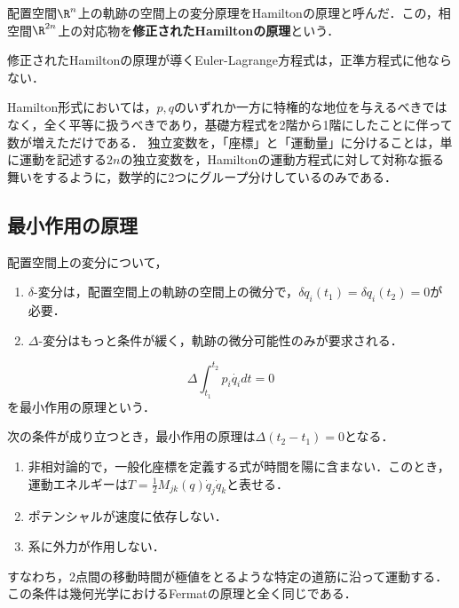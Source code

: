 \documentclass[uplatex,dvipdfmx]{jsreport}
\begin{document}
\begin{tcolorbox}[colframe=ForestGreen, colback=ForestGreen!10!white,breakable,colbacktitle=ForestGreen!40!white,coltitle=black,fonttitle=\bfseries\sffamily,
title=]
    配置空間$\R^n$上の軌跡の空間上の変分原理をHamiltonの原理と呼んだ．この，相空間$\R^{2n}$上の対応物を\textbf{修正されたHamiltonの原理}という．
\end{tcolorbox}

\begin{theorem}
    修正されたHamiltonの原理が導くEuler-Lagrange方程式は，正準方程式に他ならない．
\end{theorem}

\begin{remarks}
    Hamilton形式においては，$p,q$のいずれか一方に特権的な地位を与えるべきではなく，全く平等に扱うべきであり，基礎方程式を2階から1階にしたことに伴って数が増えただけである．
    独立変数を，「座標」と「運動量」に分けることは，単に運動を記述する$2n$の独立変数を，Hamiltonの運動方程式に対して対称な振る舞いをするように，数学的に2つにグループ分けしているのみである．
\end{remarks}

\subsection{最小作用の原理}

\begin{definition}
    配置空間上の変分について，
    \begin{enumerate}
        \item $\delta$-変分は，配置空間上の軌跡の空間上の微分で，$\delta q_i(t_1)=\delta q_i(t_2)=0$が必要．
        \item $\Delta$-変分はもっと条件が緩く，軌跡の微分可能性のみが要求される．
    \end{enumerate}
\end{definition}

\begin{axiom}
    \[\Delta\int^{t_2}_{t_1}p_i\dot{q_i}dt=0\]
    を最小作用の原理という．
\end{axiom}

\begin{proposition}[幾何光学のFermatの原理との類似性]
    次の条件が成り立つとき，最小作用の原理は$\Delta(t_2-t_1)=0$となる．
    \begin{enumerate}
        \item 非相対論的で，一般化座標を定義する式が時間を陽に含まない．このとき，運動エネルギーは$T=\frac{1}{2}M_{jk}(q)\dot{q}_j\dot{q}_k$と表せる．
        \item ポテンシャルが速度に依存しない．
        \item 系に外力が作用しない．
    \end{enumerate}
    すなわち，2点間の移動時間が極値をとるような特定の道筋に沿って運動する．
    この条件は幾何光学におけるFermatの原理と全く同じである．
\end{proposition}
\end{document}
